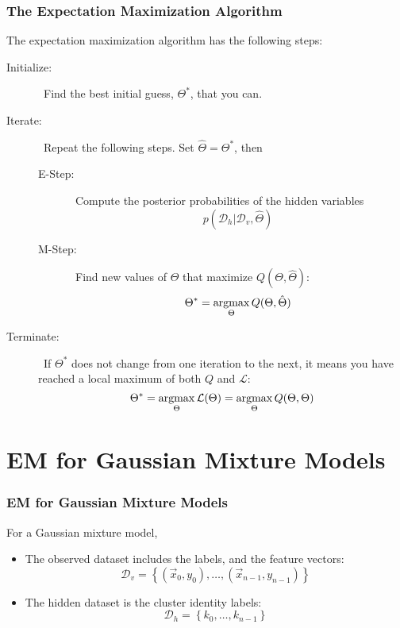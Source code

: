 \documentclass{beamer}
\newcommand{\argmax}{\operatornamewithlimits{argmax}}
\begin{document}
\begin{frame}
  \frametitle{The Expectation Maximization Algorithm}

  The expectation maximization algorithm has the following steps:
  \begin{description}
  \item[Initialize:]~Find the best initial guess, $\Theta^*$, that you can.
  \item[Iterate:]~Repeat the following steps.  Set $\hat\Theta=\Theta^*$, then
    \begin{description}
    \item[E-Step:]~Compute the posterior probabilities of the hidden variables
      \[
      p({\mathcal D}_h|{\mathcal D}_v,\hat\Theta)
      \]
    \item[M-Step:]~Find new values of $\Theta$ that maximize $Q(\Theta,\hat\Theta)$:
      \[
      \Theta^* = \argmax_\Theta Q(\Theta,\hat\Theta)
      \]
    \end{description}
  \item[Terminate:]~If $\Theta^*$ does not change from one iteration to the next,
    it means you have reached a local maximum of both $Q$ and ${\mathcal L}$:
    \[
    \Theta^* = \argmax_\Theta {\mathcal L}(\Theta)
    = \argmax_\Theta Q(\Theta,\Theta)
    \]
  \end{description}
\end{frame}
  
\section[GMM]{EM for Gaussian Mixture Models}
\setcounter{subsection}{1}


\begin{frame}
  \frametitle{EM for Gaussian Mixture Models}

  For a Gaussian mixture model,
  \begin{itemize}
  \item The observed dataset includes the labels, and the feature vectors:
    \begin{displaymath}
      {\mathcal D}_v = \left\{(\vec{x}_0,y_0),\ldots,(\vec{x}_{n-1},y_{n-1})\right\}
    \end{displaymath}
  \item The hidden dataset is the cluster identity labels:
    \begin{displaymath}
      {\mathcal D}_h = \left\{k_0,\ldots,k_{n-1}\right\}
    \end{displaymath}
  \end{itemize}
\end{frame}
\end{document}
